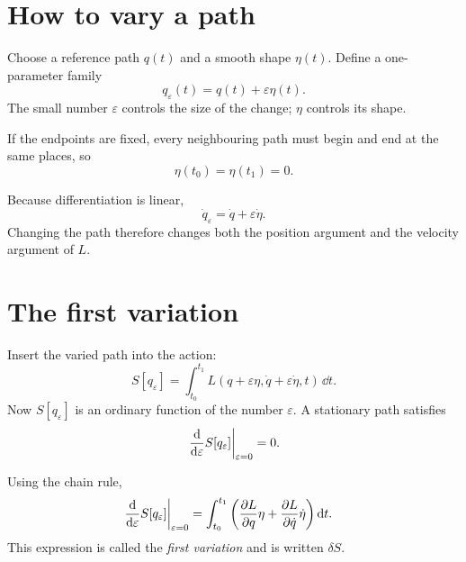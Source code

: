 \documentclass[11pt,a4paper]{article}
\begin{document}
\section{How to vary a path}

Choose a reference path $q(t)$ and a smooth shape $\eta(t)$. Define a one-parameter family
\[
q_\varepsilon(t)=q(t)+\varepsilon\eta(t).
\]
The small number $\varepsilon$ controls the size of the change; $\eta$ controls its shape.

If the endpoints are fixed, every neighbouring path must begin and end at the same places, so
\[
\boxed{\eta(t_0)=\eta(t_1)=0.}
\]

\begin{center}
\end{center}

Because differentiation is linear,
\[
\dot q_\varepsilon=\dot q+\varepsilon\dot\eta.
\]
Changing the path therefore changes both the position argument and the velocity argument of $L$.

\section{The first variation}

Insert the varied path into the action:
\[
S[q_\varepsilon]
=\int_{t_0}^{t_1}L(q+\varepsilon\eta,\dot q+\varepsilon\dot\eta,t)\,\dd t.
\]
Now $S[q_\varepsilon]$ is an ordinary function of the number $\varepsilon$. A stationary path satisfies
\[
\left.\frac{\mathop{}\!\mathrm d }{\mathop{}\!\mathrm d \varepsilon}S[q_\varepsilon]\right|_{\varepsilon=0}=0.
\]

Using the chain rule,
\begin{align*}
\left.\frac{\mathop{}\!\mathrm d }{\mathop{}\!\mathrm d \varepsilon}S[q_\varepsilon]\right|_{\varepsilon=0}
&=\int_{t_0}^{t_1}
\left(
\frac{\partial L}{\partial q}\eta+\frac{\partial L}{\partial \dot q}\dot\eta
\right)\mathop{}\!\mathrm d t.
\end{align*}
This expression is called the \emph{first variation} and is written $\delta S$.
\end{document}
